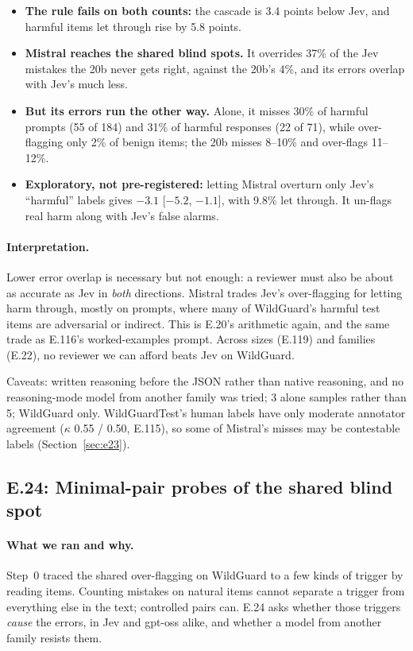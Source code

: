 \documentclass[11pt]{article}
\renewcommand{\_}{\origunderscore\allowbreak}
\begin{document}
\begin{itemize}[leftmargin=*]
  \item \textbf{The rule fails on both counts:} the cascade is 3.4 points below Jev, and harmful items let through rise by 5.8 points.
  \item \textbf{Mistral reaches the shared blind spots.} It overrides 37\% of the Jev mistakes the 20b never gets right, against the 20b's 4\%, and its errors overlap with Jev's much less.
  \item \textbf{But its errors run the other way.} Alone, it misses 30\% of harmful prompts (55 of 184) and 31\% of harmful responses (22 of 71), while over-flagging only 2\% of benign items; the 20b misses 8--10\% and over-flags 11--12\%.
  \item \textbf{Exploratory, not pre-registered:} letting Mistral overturn only Jev's ``harmful'' labels gives $-3.1$ [$-5.2$, $-1.1$], with 9.8\% let through. It un-flags real harm along with Jev's false alarms.
\end{itemize}

\paragraph{Interpretation.}
Lower error overlap is necessary but not enough: a reviewer must also be about as accurate as Jev in \emph{both} directions. Mistral trades Jev's over-flagging for letting harm through, mostly on prompts, where many of WildGuard's harmful test items are adversarial or indirect. This is E.20's arithmetic again, and the same trade as E.116's worked-examples prompt. Across sizes (E.119) and families (E.22), no reviewer we can afford beats Jev on WildGuard.

Caveats: written reasoning before the JSON rather than native reasoning, and no reasoning-mode model from another family was tried; 3 alone samples rather than 5; WildGuard only. WildGuardTest's human labels have only moderate annotator agreement ($\kappa$ 0.55 / 0.50, E.115), so some of Mistral's misses may be contestable labels (Section~\ref{sec:e23}).

\subsection{E.24: Minimal-pair probes of the shared blind spot}\label{sec:e24}

\paragraph{What we ran and why.}
Step~0 traced the shared over-flagging on WildGuard to a few kinds of trigger by reading items. Counting mistakes on natural items cannot separate a trigger from everything else in the text; controlled pairs can. E.24 asks whether those triggers \emph{cause} the errors, in Jev and gpt-oss alike, and whether a model from another family resists them.
\end{document}
